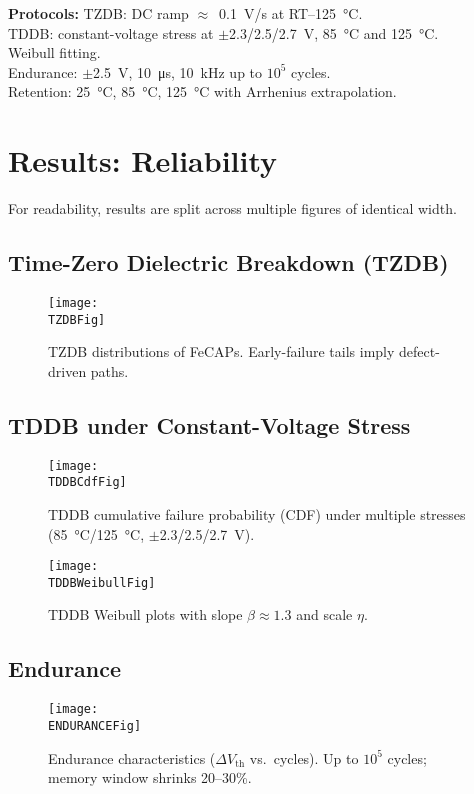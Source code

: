 \documentclass[conference]{IEEEtran}
\newcommand{\TZDBFig}{fig3_tzdb.png}
\newcommand{\TDDBCdfFig}{fig4_tddb_cdf.png}
\newcommand{\TDDBWeibullFig}{fig4_tddb_weibull.png}
\newcommand{\ENDURANCEFig}{fig5_endurance.png}
\begin{document}
\textbf{Protocols:}
TZDB: DC ramp $\approx$~\SI{0.1}{V/s} at RT--\SI{125}{\celsius}. \\
TDDB: constant-voltage stress at $\pm$2.3/2.5/2.7~V, \SI{85}{\celsius} and \SI{125}{\celsius}. \\
Weibull fitting. \\
Endurance: $\pm$2.5~V, \SI{10}{\micro\second}, 10~kHz up to $10^{5}$ cycles. \\
Retention: \SI{25}{\celsius}, \SI{85}{\celsius}, \SI{125}{\celsius} with Arrhenius extrapolation.

\section{Results: Reliability}
For readability, results are split across multiple figures of identical width.

\subsection{Time-Zero Dielectric Breakdown (TZDB)}
\begin{figure}[t]
  \centering
  \texttt{[image: \\TZDBFig]}
  \caption{TZDB distributions of FeCAPs. Early-failure tails imply defect-driven paths.}
  \label{fig:tzdb}
\end{figure}

\subsection{TDDB under Constant-Voltage Stress}
\begin{figure}[t]
  \centering
  \texttt{[image: \\TDDBCdfFig]}
  \caption{TDDB cumulative failure probability (CDF) under multiple stresses (\SI{85}{\celsius}/\SI{125}{\celsius}, $\pm$2.3/2.5/2.7~V).}
  \label{fig:tddb_cdf}
\end{figure}

\begin{figure}[t]
  \centering
  \texttt{[image: \\TDDBWeibullFig]}
  \caption{TDDB Weibull plots with slope $\beta \approx 1.3$ and scale $\eta$.}
  \label{fig:tddb_weibull}
\end{figure}

\subsection{Endurance}
\begin{figure}[t]
  \centering
  \texttt{[image: \\ENDURANCEFig]}
  \caption{Endurance characteristics ($\Delta V_\mathrm{th}$ vs.\ cycles). Up to $10^{5}$ cycles; memory window shrinks 20--30\%.}
  \label{fig:endurance}
\end{figure}
\end{document}
